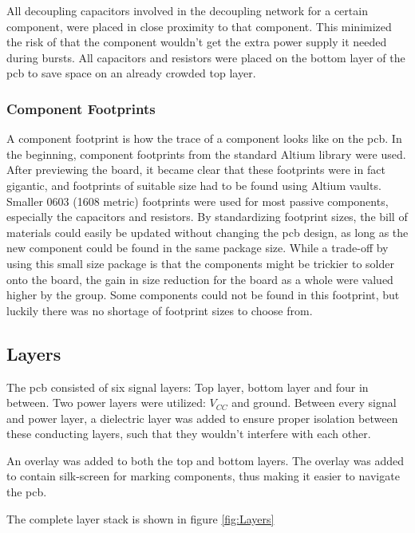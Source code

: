 All decoupling capacitors involved in the decoupling network for a certain component, were placed in close proximity to that component.
This minimized the risk of that the component wouldn't get the extra power supply it needed during bursts.
All capacitors and resistors were placed on the bottom layer of the \gls{pcb} to save space on an already crowded top layer.

\subsubsection{Component Footprints}
A component footprint is how the trace of a component looks like on the \gls{pcb}.
In the beginning, component footprints from the standard Altium library were used.
After previewing the board, it became clear that these footprints were in fact gigantic, and footprints of suitable size had to be found using Altium vaults.
Smaller 0603 (1608 metric) footprints were used for most passive components, especially the capacitors and resistors.
By standardizing footprint sizes, the bill of materials could easily be updated without changing the \gls{pcb} design, as long as the new component could be found in the same package size.
While a trade-off by using this small size package is that the components might be trickier to solder onto the board, the gain in size reduction for the board as a whole were valued higher by the group.
Some components could not be found in this footprint, but luckily there was no shortage of footprint sizes to choose from.

\subsection{Layers}
The \gls{pcb} consisted of six signal layers: Top layer, bottom layer and four in between.
Two power layers were utilized: \(V_{CC}\) and ground.
Between every signal and power layer, a dielectric layer was added to ensure proper isolation between these conducting layers, such that they wouldn't interfere with each other.

An overlay was added to both the top and bottom layers.
The overlay was added to contain silk-screen for marking components, thus making it easier to navigate the \gls{pcb}.

The complete layer stack is shown in figure \ref{fig:Layers}

